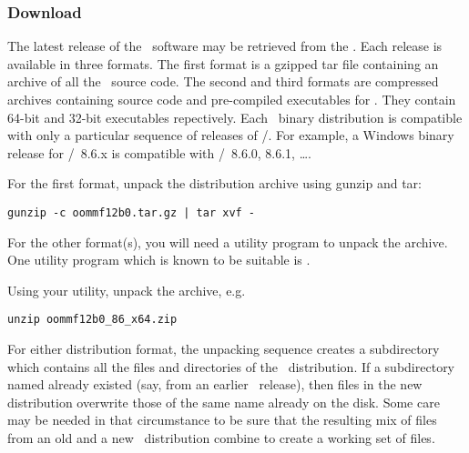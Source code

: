 \subsubsection{Download}

The latest release of the \OOMMF\ software may be retrieved from the
.  Each release is
available in three formats.  The first format is a gzipped tar file
containing an archive of all the \OOMMF\ source code.  The second and
third formats
are  compressed archives containing source code and
pre-compiled executables for \Windows.  They contain 64-bit and
32-bit executables repectively.  Each \Windows\ binary
distribution is compatible with only a particular sequence of releases
of \Tcl/\Tk.  For example, a Windows binary release for \Tcl/\Tk\ 8.6.x
is compatible with \Tcl/\Tk\ 8.6.0, 8.6.1, \ldots.  

For the first format, unpack the distribution archive using gunzip and
tar:
\begin{verbatim}
gunzip -c oommf12b0.tar.gz | tar xvf -
\end{verbatim}

For the other format(s), you will need a utility program to unpack the
 archive.  
One utility program which is known to be suitable is
.

Using your utility, unpack the  archive, e.g.
\begin{verbatim}
unzip oommf12b0_86_x64.zip
\end{verbatim}

For either distribution format, the unpacking sequence creates a
subdirectory  which contains all the files and directories
of the \OOMMF\ distribution.  If a subdirectory named 
already existed (say, from an earlier \OOMMF\ release), then
files in the new distribution overwrite those of the same name already
on the disk.  Some care may be needed in that circumstance to be
sure that the resulting mix of files from an old and a new 
\OOMMF\ distribution combine to create a working set of files.

